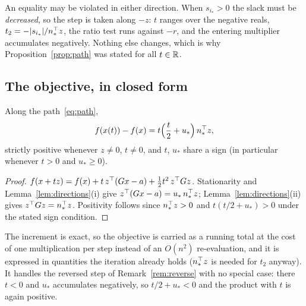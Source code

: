 \begin{remark}
\label{rem:reverse}
An equality may be violated in either direction. When $s_{i_*} > 0$ the slack must
be \emph{decreased}, so the step is taken along $-z$: $t$ ranges over the negative
reals, $t_2 = -|s_{i_*}|/n_*^{\top} z$, the ratio test runs against $-r$, and the
entering multiplier accumulates negatively. Nothing else changes, which is why
Proposition~\ref{prop:path} was stated for all $t \in \mathbb{R}$.
\end{remark}

\subsection{The objective, in closed form}

\begin{proposition}
\label{prop:increment}
Along the path~\eqref{eq:path},
\begin{equation}
  f(x(t)) - f(x) = t\Bigl(\frac{t}{2} + u_*\Bigr)\, n_*^{\top} z ,
  \label{eq:increment}
\end{equation}
strictly positive whenever $z \ne 0$, $t \ne 0$, and $t$, $u_*$ share a sign (in
particular whenever $t > 0$ and $u_* \ge 0$).
\end{proposition}

\begin{proof}
$f(x + tz) = f(x) + t\, z^{\top}(Gx - a) + \tfrac12 t^2\, z^{\top} G z$. Stationarity and
Lemma~\ref{lem:directions}(i) give $z^{\top}(Gx-a) = u_*\,n_*^{\top} z$;
Lemma~\ref{lem:directions}(ii) gives $z^{\top} G z = n_*^{\top} z$. Positivity follows since
$n_*^{\top} z > 0$ and $t(t/2+u_*) > 0$ under the stated sign condition.
\end{proof}

The increment is exact, so the objective is carried as a running total at the cost
of one multiplication per step instead of an $O(n^2)$ re-evaluation, and it is
expressed in quantities the iteration already holds ($n_*^{\top} z$ is needed for $t_2$
anyway). It handles the reversed step of Remark~\ref{rem:reverse} with no special
case: there $t < 0$ and $u_*$ accumulates negatively, so $t/2 + u_* < 0$ and the
product with $t$ is again positive.

